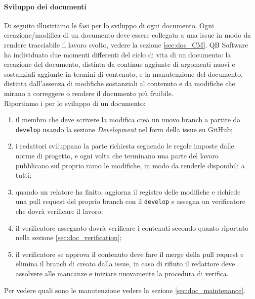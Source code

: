         \paragraph{Sviluppo dei documenti} \label{sec:doc_dev}
            Di seguito illustriamo le fasi per lo sviluppo di ogni documento. Ogni creazione/modifica di un documento deve essere collegata a una issue in modo da rendere tracciabile il lavoro svolto, vedere la sezione \ref{sec:doc_CM}. QB Software ha individuato due momenti differenti del ciclo di vita di un documento: la creazione del documento, distinta da continue aggiunte di argomenti nuovi e sostanziali aggiunte in termini di contenuto, e la manutenzione del documento, distinta dall'assenza di modifiche sostanziali al contenuto e da modifiche che mirano a correggere o rendere il documento più fruibile.
            \\
            Riportiamo i per lo sviluppo di un documento:
            \begin{enumerate}
                \item il membro che deve scrivere la modifica crea un nuovo branch a partire da \verb|develop| usando la sezione \emph{Development} nel form della issue su GitHub;
                \item i redattori sviluppano la parte richiesta seguendo le regole imposte dalle norme di progetto, e ogni volta che terminano una parte del lavoro pubblicano sul proprio ramo le modifiche, in modo da renderle disponibili a tutti;
                \item quando un relatore ha finito, aggiorna il registro delle modifiche e richiede una pull request del proprio branch con il \verb|develop| e assegna un verificatore che dovrà verificare il lavoro;
                \item il verificatore assegnato dovrà verificare i contenuti secondo quanto riportato nella sezione \ref{sec:doc_verification};
                \item il verificatore se approva il contenuto deve fare il merge della pull request e elimina il branch di creato dalla issue, in caso di rifiuto il redattore deve assolvere alle mancanze e iniziare nuovamente la procedura di verifica.
            \end{enumerate}
            Per vedere quali sono le manutenzione vedere la sezione \ref{sec:doc_maintenance}.

